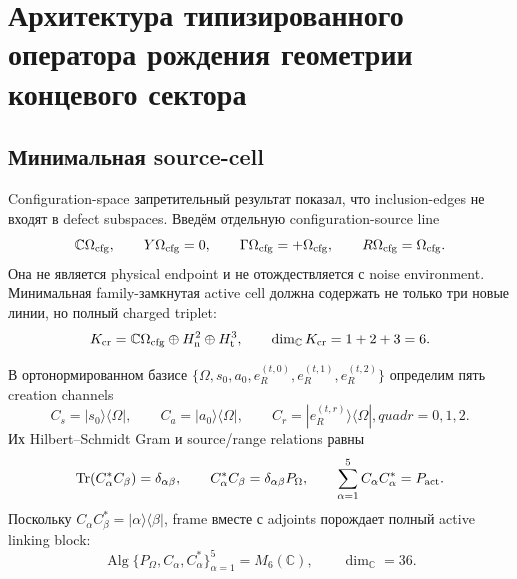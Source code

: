 \chapter{Архитектура типизированного оператора рождения геометрии концевого сектора}
\label{ch:v9-endpoint-creation-operator}

\section{Минимальная source-cell}

Configuration-space запретительный результат показал, что inclusion-edges не входят в defect
subspaces. Введём отдельную configuration-source line
\begin{equation}
 \mathbb C\Omega_{\rm cfg},
 \qquad Y\Omega_{\rm cfg}=0,
 \qquad \Gamma\Omega_{\rm cfg}=+\Omega_{\rm cfg},
 \qquad R\Omega_{\rm cfg}=\Omega_{\rm cfg}.
 \label{eq:v9-creation-source-line}
\end{equation}
Она не является physical endpoint и не отождествляется с noise environment.
Минимальная family-замкнутая active cell должна содержать не только три
новые линии, но полный charged triplet:
\begin{equation}
 K_{\rm cr}=\mathbb C\Omega_{\rm cfg}\oplus H_{\rm n}^{2}
 \oplus H_{\rm t}^{3},
 \qquad \dim_{\mathbb C}K_{\rm cr}=1+2+3=6.
 \label{eq:v9-creation-cell}
\end{equation}

В ортонормированном базисе
$\{\Omega,s_0,a_0,e_R^{(t,0)},e_R^{(t,1)},e_R^{(t,2)}\}$ определим пять
creation channels
\begin{equation}
 C_s=|s_0\rangle\langle\Omega|,
 \qquad C_a=|a_0\rangle\langle\Omega|,
 \qquad C_r=|e_R^{(t,r)}\rangle\langle\Omega|,quad r=0,1,2.
 \label{eq:v9-creation-channels}
\end{equation}
Их Hilbert--Schmidt Gram и source/range relations равны
\begin{equation}
 \operatorname{Tr}(C_\alpha^*C_\beta)=\delta_{\alpha\beta},
 \qquad C_\alpha^*C_\beta=\delta_{\alpha\beta}P_\Omega,
 \qquad \sum_{\alpha=1}^{5}C_\alpha C_\alpha^*=P_{\rm act}.
 \label{eq:v9-creation-frame-relations}
\end{equation}
Поскольку $C_\alpha C_\beta^*=|\alpha\rangle\langle\beta|$, frame вместе с
adjoints порождает полный active linking block:
\begin{equation}
 \operatorname{Alg}\{P_\Omega,C_\alpha,C_\alpha^*\}_{\alpha=1}^{5}
 =M_6(\mathbb C),
 \qquad \dim_{\mathbb C}=36.
 \label{eq:v9-creation-generated-algebra}
\end{equation}


